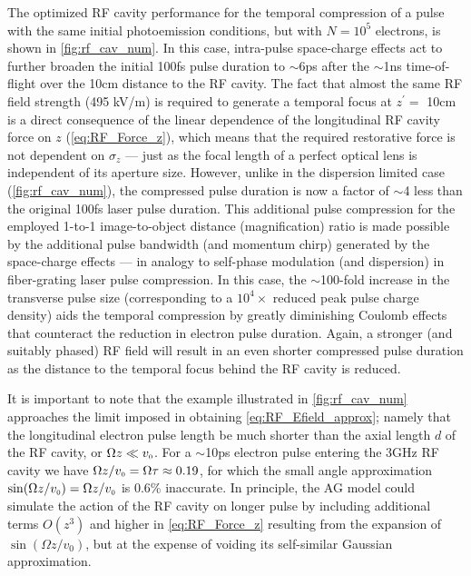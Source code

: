 The optimized RF cavity performance for the temporal compression of a pulse with the same initial photoemission conditions, but with $N = 10^{5}$ electrons, is shown in \ref{fig:rf_cav_num}.
In this case, intra-pulse space-charge effects act to further broaden the initial 100fs pulse duration to $\sim$6ps after the $\sim$1ns time-of-flight over the 10cm distance to the RF cavity.
The fact that almost the same RF field strength (495 kV/m) is required to generate a temporal focus at $z^{\prime} = $ 10cm is a direct consequence of the linear dependence of the longitudinal RF cavity force on $z$ (\ref{eq:RF_Force_z}), which means that the required restorative force is not dependent on $\sigma_{z}$ --- just as the focal length of a perfect optical lens is independent of its aperture size.
However, unlike in the dispersion limited case (\ref{fig:rf_cav_num}), the compressed pulse duration is now a factor of $\sim$4 less than the original 100fs laser pulse duration.
This additional pulse compression for the employed 1-to-1 image-to-object distance (magnification) ratio is made possible by the additional pulse bandwidth (and momentum chirp) generated by the space-charge effects --- in analogy to self-phase modulation (and dispersion) in fiber-grating laser pulse compression.\cite{strickland_compression_1985}
In this case, the $\sim$100-fold increase in the transverse pulse size (corresponding to a $10^{4}\times$ reduced peak pulse charge density) aids the temporal compression by greatly diminishing Coulomb effects that counteract the reduction in electron pulse duration.
Again, a stronger (and suitably phased) RF field will result in an even shorter compressed pulse duration as the distance to the temporal focus behind the RF cavity is reduced.

It is important to note that the example illustrated in \ref{fig:rf_cav_num} approaches the limit imposed in obtaining \ref{eq:RF_Efield_approx}; namely that the longitudinal electron pulse length be much shorter than the axial length $d$ of the RF cavity, or $ \Omega z \ll v_{{\scriptscriptstyle 0}} $.
For a $\sim$10ps electron pulse entering the 3GHz RF cavity we have $ \Omega z / v_{{\scriptscriptstyle 0}} = \Omega \tau \approx 0.19 $, for which the small angle approximation $ \sin ( \Omega z / v_{{\scriptscriptstyle 0}} ) = \Omega z / v_{{\scriptscriptstyle 0}} $ is 0.6\% inaccurate.
In principle, the AG model could simulate the action of the RF cavity on longer pulse by including additional terms $O \left ( z^{3} \right )$ and higher in \ref{eq:RF_Force_z} resulting from the expansion of $ \sin \left ( \Omega z / v_{0} \right ) $, but at the expense of voiding its self-similar Gaussian approximation.

